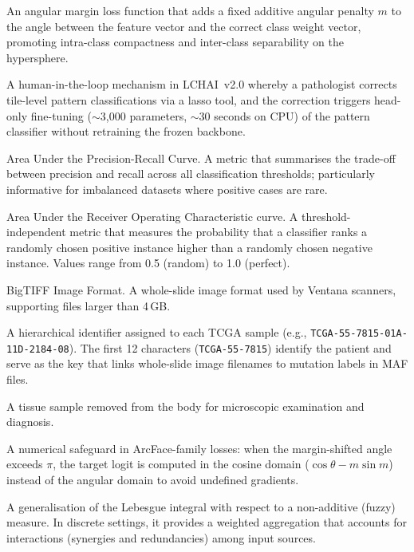 \begin{description}[style=nextline,leftmargin=4cm]
\item[ArcFace] An angular margin loss function that adds a fixed additive angular penalty $m$ to the angle between the feature vector and the correct class weight vector, promoting intra-class compactness and inter-class separability on the hypersphere.


\item[Active learning (delta training)] A human-in-the-loop mechanism in LCHAI~v2.0 whereby a pathologist corrects tile-level pattern classifications via a lasso tool, and the correction triggers head-only fine-tuning ($\sim$3{,}000 parameters, $\sim$30 seconds on CPU) of the pattern classifier without retraining the frozen backbone.

\item[AUPRC] Area Under the Precision-Recall Curve.  A metric that summarises the trade-off between precision and recall across all classification thresholds; particularly informative for imbalanced datasets where positive cases are rare.


\item[AUROC] Area Under the Receiver Operating Characteristic curve.  A threshold-independent metric that measures the probability that a classifier ranks a randomly chosen positive instance higher than a randomly chosen negative instance.  Values range from 0.5 (random) to 1.0 (perfect).


\item[BIF] BigTIFF Image Format.  A whole-slide image format used by Ventana scanners, supporting files larger than 4\,GB.


\item[Barcode (TCGA)] A hierarchical identifier assigned to each TCGA sample (e.g., \texttt{TCGA-55-7815-01A-11D-2184-08}).  The first 12 characters (\texttt{TCGA-55-7815}) identify the patient and serve as the key that links whole-slide image filenames to mutation labels in MAF files.


\item[Biopsy] A tissue sample removed from the body for microscopic examination and diagnosis.


\item[Boundary correction] A numerical safeguard in ArcFace-family losses: when the margin-shifted angle exceeds $\pi$, the target logit is computed in the cosine domain ($\cos\theta - m\sin m$) instead of the angular domain to avoid undefined gradients.


\item[Choquet integral] A generalisation of the Lebesgue integral with respect to a non-additive (fuzzy) measure.  In discrete settings, it provides a weighted aggregation that accounts for interactions (synergies and redundancies) among input sources.



\end{description}
